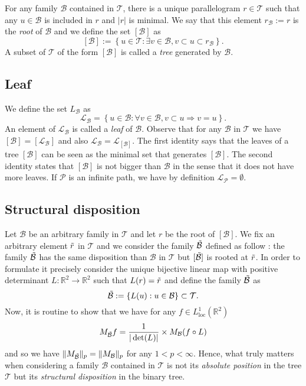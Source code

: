 \documentclass{article}
\begin{document}
For any family $\mathcal{B}$ contained in $\mathcal{T}$, there is a unique parallelogram $r \in \mathcal{T}$ such that any $u \in \mathcal{B}$ is included in $r$ and $|r|$ is minimal. We say that this element $r_\mathcal{B} := r$ is the \textit{root} of $\mathcal{B}$ and we define the set $[\mathcal{B}]$ as $$[\mathcal{B}] := \left\{ u \in \mathcal{T} : \exists v \in \mathcal{B}, v \subset u \subset r_\mathcal{B} \right\}.$$ A subset of  $\mathcal{T}$ of the form $[\mathcal{B}]$ is called a \textit{tree} generated by $\mathcal{B}$.


\subsection*{Leaf}

We define the set $L_\mathcal{B}$ as $$\mathcal{L}_\mathcal{B} = \left\{ u \in \mathcal{B} : \forall v \in \mathcal{B}, v \subset u \Rightarrow v = u \right\}.$$ An element of $\mathcal{L}_\mathcal{B}$ is called a \textit{leaf} of $\mathcal{B}$. Observe that for any $\mathcal{B}$ in $\mathcal{T}$ we have $[\mathcal{B}] = [\mathcal{L}_\mathcal{B}]$ and also $ \mathcal{L}_\mathcal{B} = \mathcal{L}_{[\mathcal{B}]}$. The first identity says that the leaves of a tree $[\mathcal{B}]$ can be seen as the minimal set that generates $[\mathcal{B}]$. The second identity states that $[\mathcal{B}]$ is not bigger than $\mathcal{B}$ in the sense that it does not have more leaves. If $\mathcal{P}$ is an infinite path, we have by definition $\mathcal{L}_\mathcal{P} = \emptyset$.



\subsection*{Structural disposition}

Let $\mathcal{B}$ be an arbitrary family in $\mathcal{T}$ and let $r$ be the root of $[\mathcal{B}]$. We fix an arbitrary element $\Tilde{r}$ in $\mathcal{T}$ and we consider the family $\Tilde{\mathcal{B}}$ defined as follow : the family $\Tilde{\mathcal{B}}$ has the same disposition than $\mathcal{B}$ in $\mathcal{T}$ but $[\Tilde{\mathcal{B}}]$ is rooted at $\Tilde{r}$. In order to formulate it precisely consider the unique bijective linear map with positive determinant $L : \mathbb{R}^2 \rightarrow \mathbb{R}^2 $ such that $L(r) = \Tilde{r}$ and define the family $\Tilde{\mathcal{B}}$ as $$\Tilde{\mathcal{B}} := \left\{ L(u) : u \in \mathcal{B} \right\} \subset \mathcal{T}.$$ Now, it is routine to show that we have for any $f \in L^1_{\mathrm{loc}}(\mathbb{R}^2)$ $$M_{\Tilde{\mathcal{B}}} f = \frac{1}{|\det(L)|} \times M_\mathcal{B} (f \circ L)$$ and so we have $\|M_{\Tilde{\mathcal{B}}}\|_p = \|M_{{\mathcal{B}}}\|_p$ for any $1 < p < \infty$. Hence, what truly matters when considering a family $\mathcal{B}$ contained in $\mathcal{T}$ is not its \textit{absolute position} in the tree $\mathcal{T}$ but its \textit{structural disposition} in the binary tree. 
\end{document}
